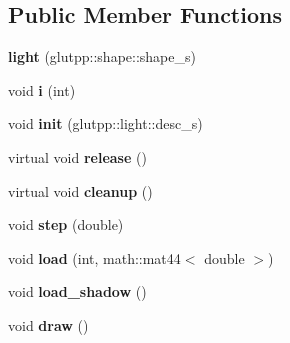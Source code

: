 \subsection*{\-Public \-Member \-Functions}
\begin{DoxyCompactItemize}
\item 
\hypertarget{classglutpp_1_1light_1_1light_a0ca55171134122bde88842bf7ec2fcce}{{\bfseries light} (glutpp\-::shape\-::shape\-\_\-s)}\label{classglutpp_1_1light_1_1light_a0ca55171134122bde88842bf7ec2fcce}

\item 
\hypertarget{classglutpp_1_1light_1_1light_afb6aab641a407977f43393f1145e9ae9}{void {\bfseries i} (int)}\label{classglutpp_1_1light_1_1light_afb6aab641a407977f43393f1145e9ae9}

\item 
\hypertarget{classglutpp_1_1light_1_1light_ac7325e859b66652b5807d0793af509f3}{void {\bfseries init} (glutpp\-::light\-::desc\-\_\-s)}\label{classglutpp_1_1light_1_1light_ac7325e859b66652b5807d0793af509f3}

\item 
\hypertarget{classglutpp_1_1light_1_1light_a84dc2f6887e3423c6083c5c7117e5705}{virtual void {\bfseries release} ()}\label{classglutpp_1_1light_1_1light_a84dc2f6887e3423c6083c5c7117e5705}

\item 
\hypertarget{classglutpp_1_1light_1_1light_a2b84a85ec45ca3c1ce026b66fb0ae310}{virtual void {\bfseries cleanup} ()}\label{classglutpp_1_1light_1_1light_a2b84a85ec45ca3c1ce026b66fb0ae310}

\item 
\hypertarget{classglutpp_1_1light_1_1light_ad27fbd7b4fe66e9137ca3b465042c33f}{void {\bfseries step} (double)}\label{classglutpp_1_1light_1_1light_ad27fbd7b4fe66e9137ca3b465042c33f}

\item 
\hypertarget{classglutpp_1_1light_1_1light_a2fda115dbe9c4aa72d5a95126c9e241b}{void {\bfseries load} (int, math\-::mat44$<$ double $>$)}\label{classglutpp_1_1light_1_1light_a2fda115dbe9c4aa72d5a95126c9e241b}

\item 
\hypertarget{classglutpp_1_1light_1_1light_aa37d836e3b1ea0fbd44023482069e0b5}{void {\bfseries load\-\_\-shadow} ()}\label{classglutpp_1_1light_1_1light_aa37d836e3b1ea0fbd44023482069e0b5}

\item 
\hypertarget{classglutpp_1_1light_1_1light_acc8af2c86de3c4e0966ad2e7cdb654ee}{void {\bfseries draw} ()}\label{classglutpp_1_1light_1_1light_acc8af2c86de3c4e0966ad2e7cdb654ee}


\end{DoxyCompactItemize}
